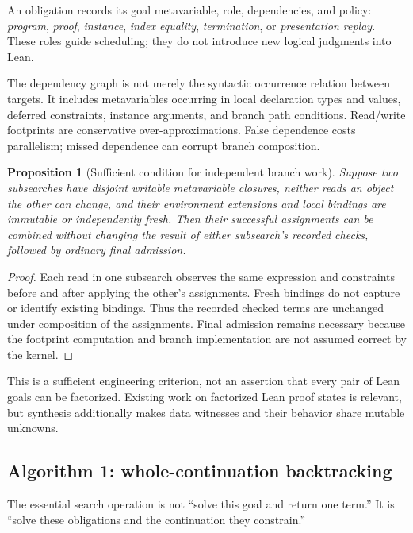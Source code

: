 \documentclass[11pt,letterpaper]{article}
\newtheorem{proposition}[theorem]{Proposition}
\theoremstyle{definition}\newtheorem{definition}[theorem]{Definition}
\theoremstyle{remark}\newtheorem{remark}[theorem]{Remark}
\begin{document}
An obligation records its goal metavariable, role, dependencies, and policy:
\emph{program}, \emph{proof}, \emph{instance}, \emph{index equality},
\emph{termination}, or \emph{presentation replay}. These roles guide scheduling;
they do not introduce new logical judgments into Lean.

The dependency graph is not merely the syntactic occurrence relation between
targets. It includes metavariables occurring in local declaration types and
values, deferred constraints, instance arguments, and branch path conditions.
Read/write footprints are conservative over-approximations. False dependence
costs parallelism; missed dependence can corrupt branch composition.

\begin{proposition}[Sufficient condition for independent branch work]
Suppose two subsearches have disjoint writable metavariable closures, neither
reads an object the other can change, and their environment extensions and local
bindings are immutable or independently fresh. Then their successful assignments
can be combined without changing the result of either subsearch's recorded
checks, followed by ordinary final admission.
\end{proposition}
\begin{proof}
Each read in one subsearch observes the same expression and constraints before
and after applying the other's assignments. Fresh bindings do not capture or
identify existing bindings. Thus the recorded checked terms are unchanged under
composition of the assignments. Final admission remains necessary because the
footprint computation and branch implementation are not assumed correct by the
kernel.
\end{proof}

This is a sufficient engineering criterion, not an assertion that every pair of
Lean goals can be factorized. Existing work on factorized Lean proof states is
relevant, but synthesis additionally makes data witnesses and their behavior
share mutable unknowns.\cite{leantree}

\subsection{Algorithm 1: whole-continuation backtracking}
\label{sec:continuation}

The essential search operation is not ``solve this goal and return one term.''
It is ``solve these obligations and the continuation they constrain.''
\end{document}
